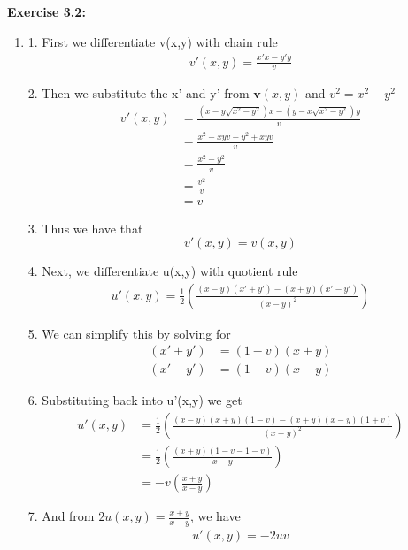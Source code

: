 \documentclass[12pt]{article}
\begin{document}
\noindent \textbf{Exercise 3.2:}
\begin{enumerate}
  \item [(a)]

        1. First we differentiate v(x,y) with chain rule
        \begin{align*}
          v'(x,y) = \frac{x'x-y'y}{v}
        \end{align*}

        2. Then we substitute the x' and y' from $\mathbf{v}(x,y)$ and $v^2 = x^2-y^2$
        \begin{align*}
          v'(x,y) & = \frac{(x-y\sqrt{x^2-y^2})x-(y-x\sqrt{x^2-y^2})y}{v} \\
                  & = \frac{x^2-xyv-y^2+xyv}{v}                           \\
                  & = \frac{x^2-y^2}{v}                                   \\
                  & = \frac{v^2}{v}                                       \\
                  & = v
        \end{align*}

        3. Thus we have that
        \[
          v'(x,y) = v(x,y)
        \]

        4. Next, we differentiate u(x,y) with quotient rule
        \begin{align*}
          u'(x, y) = \frac{1}{2}(\frac{(x-y)(x'+y')-(x+y)(x'-y')}{(x-y)^2})
        \end{align*}

        5. We can simplify this by solving for
        \begin{align*}
          (x' + y') & = (1-v)(x+y) \\
          (x' - y') & = (1-v)(x-y)
        \end{align*}

        6. Substituting back into u'(x,y) we get
        \begin{align*}
          u'(x, y) & = \frac{1}{2}(\frac{(x-y)(x+y)(1-v)-(x+y)(x-y)(1+v)}{(x-y)^2}) \\
                   & = \frac{1}{2}(\frac{(x+y)(1-v-1-v)}{x-y})                      \\
                   & = -v(\frac{x+y}{x-y})
        \end{align*}

        7. And from $2u(x,y) = \frac{x+y}{x-y}$, we have
        \begin{align*}
          u'(x, y) = -2uv
        \end{align*}


\end{enumerate}
\end{document}
